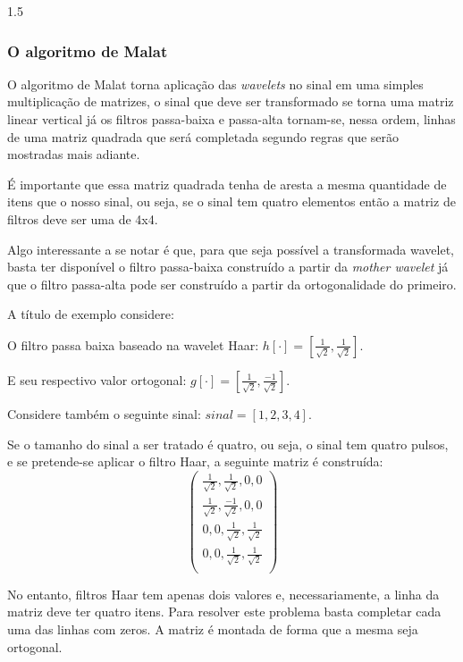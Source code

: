 \documentclass[a4paper,12pt,openright,oneside]{book}
\newenvironment{myenv}[1]
  {\begin{spacing}{#1}}
  {\end{spacing}}
\begin{document}
\begin{myenv}{1.5}
				\subsubsection{O algoritmo de Malat}
				\par O algoritmo de Malat torna aplicação das \textit{wavelets} no sinal em uma simples multiplicação de matrizes, o sinal que deve ser transformado se torna uma matriz linear vertical já os filtros passa-baixa e passa-alta tornam-se, nessa ordem, linhas de uma matriz quadrada que será completada segundo regras que serão mostradas mais adiante.
				\par É importante que essa matriz quadrada tenha de aresta a mesma quantidade de itens que o nosso sinal, ou seja, se o sinal tem quatro elementos então a matriz de filtros deve ser uma de 4x4.
				\par Algo interessante a se notar é que, para que seja possível a transformada wavelet, basta ter disponível o filtro passa-baixa construído a partir da \textit{mother wavelet} já que o filtro passa-alta pode ser construído a partir da ortogonalidade do primeiro.
				\par A título de exemplo considere:
				\par O filtro passa baixa baseado na wavelet Haar:
				$h[\cdot] = [\frac{1}{\sqrt{2}}, \frac{1}{\sqrt{2}}]$.
				
				\par E seu respectivo valor ortogonal:
				$g[\cdot] = [\frac{1}{\sqrt{2}}, \frac{-1}{\sqrt{2}}]$.
				
				\par Considere também o seguinte sinal:	$sinal = [1,2,3,4]$.

				\par Se o tamanho do sinal a ser tratado é quatro, ou seja, o sinal tem quatro pulsos, e se pretende-se aplicar o filtro Haar, a seguinte matriz é construída:
				\begin{equation}
					\begin{pmatrix}
						\frac{1}{\sqrt{2}}, \frac{1}{\sqrt{2}}, 0, 0\\
						\frac{1}{\sqrt{2}}, \frac{-1}{\sqrt{2}}, 0, 0\\
						0, 0, \frac{1}{\sqrt{2}}, \frac{1}{\sqrt{2}}\\
						0, 0, \frac{1}{\sqrt{2}}, \frac{1}{\sqrt{2}}\\
					\end{pmatrix} 
				\end{equation}
				\par No entanto, filtros Haar tem apenas dois valores e, necessariamente, a linha da matriz deve ter quatro itens. Para resolver este problema basta completar cada uma das linhas com zeros. A matriz é montada de forma que a mesma seja ortogonal.


\end{myenv}
\end{document}
